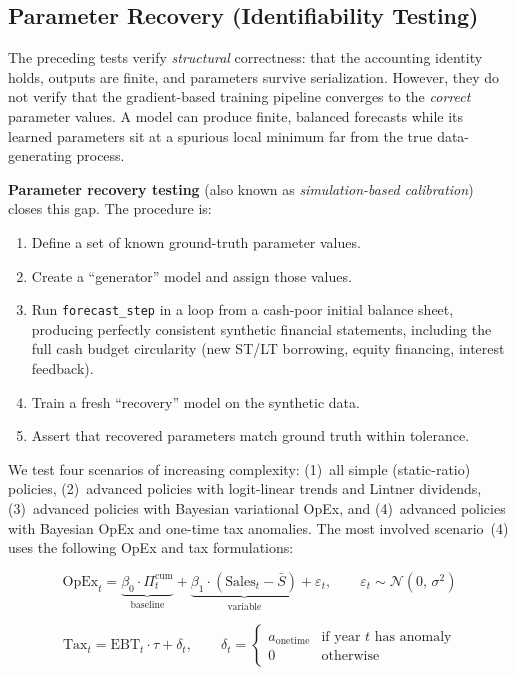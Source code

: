 \documentclass[12pt,a4paper]{article}
\begin{document}
\subsection{Parameter Recovery (Identifiability Testing)}

The preceding tests verify \emph{structural} correctness: that the
accounting identity holds, outputs are finite, and parameters survive
serialization.  However, they do not verify that the gradient-based
training pipeline converges to the \emph{correct} parameter values.  A
model can produce finite, balanced forecasts while its learned
parameters sit at a spurious local minimum far from the true
data-generating process.

\textbf{Parameter recovery testing} (also known as
\emph{simulation-based calibration}) closes this gap.  The procedure
is:
\begin{enumerate}
  \item Define a set of known ground-truth parameter values.
  \item Create a ``generator'' model and assign those values.
  \item Run \texttt{forecast\_step} in a loop from a cash-poor initial
    balance sheet, producing perfectly consistent synthetic financial
    statements, including the full cash budget circularity (new ST/LT
    borrowing, equity financing, interest feedback).
  \item Train a fresh ``recovery'' model on the synthetic data.
  \item Assert that recovered parameters match ground truth within
    tolerance.
\end{enumerate}

We test four scenarios of increasing complexity: (1)~all simple
(static-ratio) policies, (2)~advanced policies with logit-linear
trends and Lintner dividends, (3)~advanced policies with Bayesian
variational OpEx, and (4)~advanced policies with Bayesian OpEx and
one-time tax anomalies.  The most involved scenario~(4) uses the
following OpEx and tax formulations:

\begin{equation}\label{eq:opex_bayesian_recovery}
\text{OpEx}_t = \underbrace{\beta_0 \cdot \Pi_t^{\text{cum}}}_{\text{baseline}} + \underbrace{\beta_1 \cdot (\text{Sales}_t - \bar{S})}_{\text{variable}} + \varepsilon_t, \qquad \varepsilon_t \sim \mathcal{N}(0,\,\sigma^2)
\end{equation}

\begin{equation}\label{eq:tax_anomaly_recovery}
\text{Tax}_t = \text{EBT}_t \cdot \tau + \delta_t, \qquad \delta_t = \begin{cases} a_{\text{onetime}} & \text{if year } t \text{ has anomaly} \\ 0 & \text{otherwise} \end{cases}
\end{equation}
\end{document}
